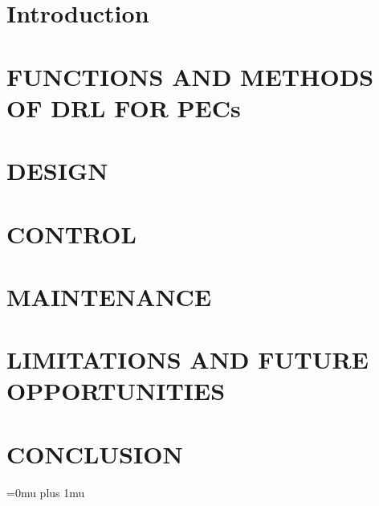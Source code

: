 \documentclass[journal]{IEEEtran}
\begin{document}

\maketitle
\IEEEpeerreviewmaketitle


 


\section{Introduction}
\label{sec_intro}


\section{FUNCTIONS AND METHODS OF DRL FOR PECs}
\label{sec_conv}


\section{DESIGN}
\label{sec_prop}


\section{CONTROL}


\section{MAINTENANCE}
\label{sec_results}


% 
% 

\section{LIMITATIONS AND FUTURE OPPORTUNITIES}
\label{sec_future}


\section{CONCLUSION}
\label{sec_conclusion}


% 

% 



\Urlmuskip=0mu plus 1mu\relax



% 
\end{document}

